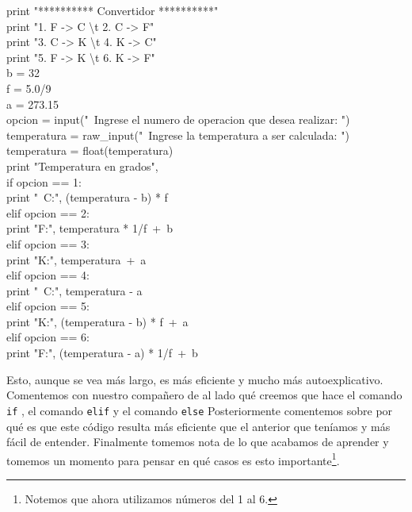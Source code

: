 \documentclass[10pt,letterpaper]{article}
\newcommand{\inlinecode}[1]{
\colorbox{light-gray}{\texttt{#1}}
}
\newenvironment{Code}
{
\begin{lrbox}{\selvestebox}%
\begin{minipage}{\dimexpr\columnwidth-2\fboxsep\relax}
\fontfamily{\ttdefault}\selectfont
}
{\end{minipage}\end{lrbox}%
\begin{center}
\colorbox{light-gray}{\usebox{\selvestebox}}
\end{center}
}
\begin{document}
\begin{Code}
print "********** Convertidor **********"\\
print "1. F -> C \textbackslash t 2. C -> F"\\
print "3. C -> K \textbackslash t 4. K -> C"\\
print "5. F -> K \textbackslash t 6. K -> F"\\
b = 32\\
f = 5.0/9\\
a = 273.15\\
opcion = input("\ \hspace{-2mm}Ingrese el numero de operacion que desea realizar: ")\\
temperatura = raw\_input("\ \hspace{-2mm}Ingrese la temperatura a ser calculada: ")\\
temperatura = float(temperatura)\\
print "Temperatura en grados",\\
if opcion == 1:\\
\hspace*{5mm} print "\ \hspace*{-2mm}C:", (temperatura - b) * f\\
elif opcion == 2:\\
\hspace*{5mm} print "F:", temperatura * 1/f\ +\ b\\
elif opcion == 3:\\
\hspace*{5mm} print "K:", temperatura\ +\ a\\
elif opcion == 4:\\
\hspace*{5mm} print "\ \hspace*{-2mm}C:", temperatura - a\\
elif opcion == 5:\\
\hspace*{5mm} print "K:", (temperatura - b) * f\ +\ a\\
elif opcion == 6:\\
\hspace*{5mm} print "F:", (temperatura - a) * 1/f\ +\ b
\end{Code}

Esto, aunque se vea m\'as largo, es m\'as eficiente y mucho m\'as autoexplicativo. Comentemos con nuestro compa\~nero de al lado qu\'e creemos que hace el comando \inlinecode{if}, el comando \inlinecode{elif} y el comando \inlinecode{else} Posteriormente comentemos sobre por qu\'e es que este c\'odigo resulta m\'as eficiente que el anterior que ten\'iamos y m\'as f\'acil de entender. Finalmente tomemos nota de lo que acabamos de aprender y tomemos un momento para pensar en qu\'e casos es esto importante\footnote{Notemos que ahora utilizamos n\'umeros del 1 al 6.}.
\end{document}
